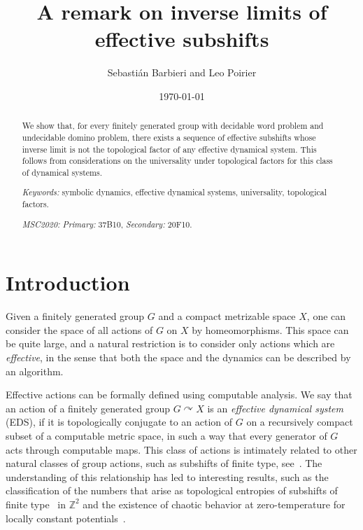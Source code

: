 \documentclass{article}
\title{A remark on inverse limits of effective subshifts}
\author{Sebasti\'an Barbieri and Leo Poirier}
\date{\today}
\theoremstyle{definition}
\theoremstyle{plain}
\newcommand{\ZZ}{\mathbb{Z}}
\newcommand{\define}[1]{\textit{#1}}
\begin{document}
\maketitle

\begin{abstract}
    We show that, for every finitely generated group with decidable word problem and undecidable domino problem, there exists a sequence of effective subshifts whose inverse limit is not the topological factor of any effective dynamical system. This follows from considerations on the universality under topological factors for this class of dynamical systems. 
		\medskip
		
		\noindent
		\emph{Keywords:} symbolic dynamics, effective dynamical systems, universality, topological factors.
		
		\smallskip
		
		\noindent
		\emph{MSC2020:} \textit{Primary:}
        37B10, %
		\textit{Secondary:} 20F10. %
        


\end{abstract}



\section{Introduction}

Given a finitely generated group $G$ and a compact metrizable space $X$, one can consider the space of all actions of $G$ on $X$ by homeomorphisms. This space can be quite large, and a natural restriction is to consider only actions which are \textit{effective}, in the sense that both the space and the dynamics can be described by an algorithm. 

Effective actions can be formally defined using computable analysis. We say that an action of a finitely generated group $G\curvearrowright X$ is an \define{effective dynamical system} (EDS), if it is topologically conjugate to an action of $G$ on a recursively compact subset of a computable metric space, in such a way that every generator of $G$ acts through computable maps. This class of actions is intimately related to other natural classes of group actions, such as subshifts of finite type, see~\cite{Hochman2009b_simulation,BarCarRoj2025}. The understanding of this relationship has led to interesting results, such as the classification of the numbers that arise as topological entropies of subshifts of finite type~\cite{HochmanMeyerovitch2010} in $\ZZ^2$ and the existence of chaotic behavior at zero-temperature for locally constant potentials~\cite{Chazottes2010}.
\end{document}
